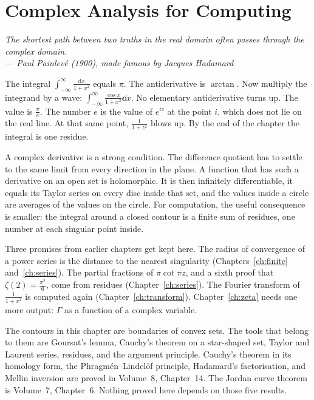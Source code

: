 \chapter{Complex Analysis for Computing}\label{ch:complex}

\begin{center}\itshape
The shortest path between two truths in the real domain often passes through the complex domain.\\
\upshape --- Paul Painlev\'e (1900), made famous by Jacques Hadamard
\end{center}

The integral $\int_{-\infty}^\infty\frac{\mathrm dx}{1+x^2}$ equals $\pi$. The antiderivative is $\arctan$. Now multiply the integrand by a wave: $\int_{-\infty}^\infty\frac{\cos x}{1+x^2}\dd x$. No elementary antiderivative turns up. The value is $\frac\pi e$. The number $e$ is the value of $e^{iz}$ at the point $i$, which does not lie on the real line. At that same point, $\frac1{1+z^2}$ blows up. By the end of the chapter the integral is one residue.

A complex derivative is a strong condition. The difference quotient has to settle to the same limit from every direction in the plane. A function that has such a derivative on an open set is holomorphic. It is then infinitely differentiable, it equals its Taylor series on every disc inside that set, and the values inside a circle are averages of the values on the circle. For computation, the useful consequence is smaller: the integral around a closed contour is a finite sum of residues, one number at each singular point inside.

Three promises from earlier chapters get kept here. The radius of convergence of a power series is the distance to the nearest singularity (Chapters~\ref{ch:finite} and~\ref{ch:series}). The partial fractions of $\pi\cot\pi z$, and a sixth proof that $\zeta(2)=\frac{\pi^2}6$, come from residues (Chapter~\ref{ch:series}). The Fourier transform of $\frac1{1+x^2}$ is computed again (Chapter~\ref{ch:transform}). Chapter~\ref{ch:zeta} needs one more output: $\Gamma$ as a function of a complex variable.

The contours in this chapter are boundaries of convex sets. The tools that belong to them are Goursat's lemma, Cauchy's theorem on a star-shaped set, Taylor and Laurent series, residues, and the argument principle. Cauchy's theorem in its homology form, the Phragm\'en--Lindel\"of principle, Hadamard's factorisation, and Mellin inversion are proved in Volume~8, Chapter~14. The Jordan curve theorem is Volume~7, Chapter~6. Nothing proved here depends on those five results.

